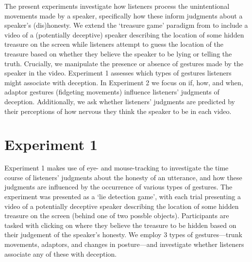 \documentclass[a4paper,man,natbib]{apa6}
\begin{document}
The present experiments investigate how listeners process the unintentional movements made by a speaker, specifically how these inform judgments about a speaker's (dis)honesty.
We extend the `treasure game' paradigm from \citet{Loy2017} to include a video of a (potentially deceptive) speaker describing the location of some hidden treasure on the screen while listeners attempt to guess the location of the treasure based on whether they believe the speaker to be lying or telling the truth.
Crucially, we manipulate the presence or absence of gestures made by the speaker in the video.
Experiment 1 assesses which types of gestures listeners might associate with deception.
In Experiment 2 we focus on if, how, and when, adaptor gestures (fidgeting movements) influence listeners' judgments of deception.
Additionally, we ask whether listeners' judgments are predicted by their perceptions of how nervous they think the speaker to be in each video.

\section{Experiment 1}
Experiment 1 makes use of eye- and mouse-tracking to investigate the time course of listeners' judgments about the honesty of an utterance, and how these judgments are influenced by the occurrence of various types of gestures. 
The experiment was presented as a `lie detection game', with each trial presenting a video of a potentially deceptive speaker describing the location of some hidden treasure on the screen (behind one of two possble objects). 
Participants are tasked with clicking on where they believe the treasure to be hidden based on their judgement of the speaker's honesty.
We employ 3 types of gestures---trunk movements, adaptors, and changes in posture---and investigate whether listeners associate any of these with deception.

\end{document}
